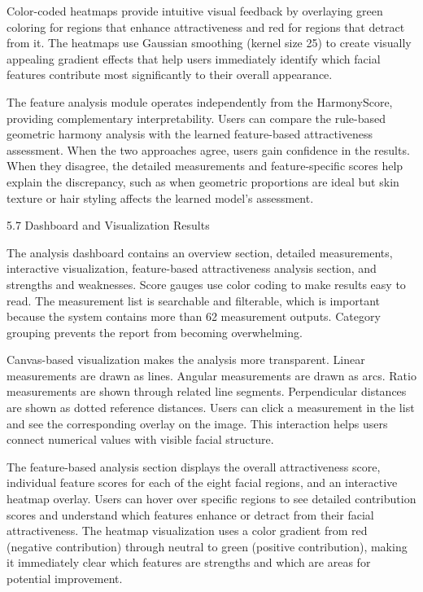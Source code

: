 Color-coded heatmaps provide intuitive visual feedback by overlaying green coloring for regions that enhance attractiveness and red for regions that detract from it. The heatmaps use Gaussian smoothing (kernel size 25) to create visually appealing gradient effects that help users immediately identify which facial features contribute most significantly to their overall appearance.

The feature analysis module operates independently from the HarmonyScore, providing complementary interpretability. Users can compare the rule-based geometric harmony analysis with the learned feature-based attractiveness assessment. When the two approaches agree, users gain confidence in the results. When they disagree, the detailed measurements and feature-specific scores help explain the discrepancy, such as when geometric proportions are ideal but skin texture or hair styling affects the learned model's assessment.

5.7  Dashboard and Visualization Results

The analysis dashboard contains an overview section, detailed measurements, interactive visualization, feature-based attractiveness analysis section, and strengths and weaknesses. Score gauges use color coding to make results easy to read. The measurement list is searchable and filterable, which is important because the system contains more than 62 measurement outputs. Category grouping prevents the report from becoming overwhelming.

Canvas-based visualization makes the analysis more transparent. Linear measurements are drawn as lines. Angular measurements are drawn as arcs. Ratio measurements are shown through related line segments. Perpendicular distances are shown as dotted reference distances. Users can click a measurement in the list and see the corresponding overlay on the image. This interaction helps users connect numerical values with visible facial structure.

The feature-based analysis section displays the overall attractiveness score, individual feature scores for each of the eight facial regions, and an interactive heatmap overlay. Users can hover over specific regions to see detailed contribution scores and understand which features enhance or detract from their facial attractiveness. The heatmap visualization uses a color gradient from red (negative contribution) through neutral to green (positive contribution), making it immediately clear which features are strengths and which are areas for potential improvement.

